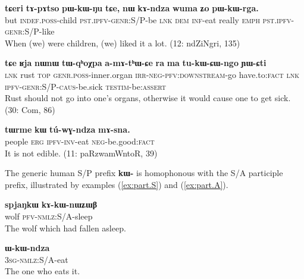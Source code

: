 \documentclass[oldfontcommands,oneside,a4paper,11pt]{article}
\newcommand{\ipa}[1]{\mbox{\phon\textbf{#1}}} %
\begin{document}
\begin{exe}
\ex \label{ex:pWkWNu}
\gll
\ipa{tɕeri} 	\ipa{tɤ-pɤtso} 	\ipa{pɯ-kɯ-ŋu} 	\ipa{tɕe,} 	\ipa{nɯ} 	\ipa{kɤ-ndza} 	\ipa{wuma} 	\ipa{ʑo} 	\ipa{pɯ-kɯ-rga.} \\
but \textsc{indef.poss}-child \textsc{pst.ipfv-genr}:S/P-be \textsc{lnk} \textsc{dem} \textsc{inf}-eat really \textsc{emph} \textsc{pst.ipfv-genr}:S/P-like \\
\glt When (we) were children, (we) liked it a lot. (12: ndZiNgri, 135)
\end{exe}


\begin{exe}
\ex \label{ex:tukWCWngo}
\gll  \ipa{tɕe} 	\ipa{ʁja} 	\ipa{nɯnɯ} 	\ipa{tɯ-qʰoχpa} 	\ipa{a-mɤ-tʰɯ-ɕe} 	\ipa{ra} 	\ipa{ma} 	\ipa{tu-kɯ-ɕɯ-ngo} 	\ipa{ɲɯ-ɕti} \\
\textsc{lnk} rust \textsc{top} \textsc{genr.poss}-inner.organ \textsc{irr-neg-pfv:downstream}-go have.to:\textsc{fact} \textsc{lnk} \textsc{ipfv-genr:S/P-caus}-be.sick  \textsc{testim}-be:\textsc{assert} \\
\glt Rust should not go into one's organs, otherwise it would cause one to get sick. (30: Com, 86)
\end{exe}

\begin{exe}
\ex  \label{ex:genr.tWrme}
\gll
\ipa{tɯrme} 	\ipa{kɯ} 	\ipa{tú-wɣ-ndza} 	\ipa{mɤ-sna.} \\
people \textsc{erg} \textsc{ipfv-inv}-eat \textsc{neg}-be.good:\textsc{fact} \\
\glt It is not edible. (11: paRzwamWntoR, 39)
\end{exe}

The generic human S/P prefix \ipa{kɯ-} is homophonous with the S/A participle prefix, illustrated by examples (\ref{ex:part.S}) and (\ref{ex:part.A}).

\begin{exe}
\ex \label{ex:part.S}
\gll \ipa{spjaŋkɯ}	\ipa{kɤ-kɯ-nɯʑɯβ}	\\
wolf \textsc{pfv-nmlz}:S/A-sleep \\
\glt The wolf which had fallen asleep.
\end{exe}

\begin{exe}
\ex \label{ex:part.A}
\gll \ipa{ɯ-kɯ-ndza} \\
\textsc{3sg-nmlz}:S/A-eat \\
\glt The one who eats it.
\end{exe}
\end{document}
